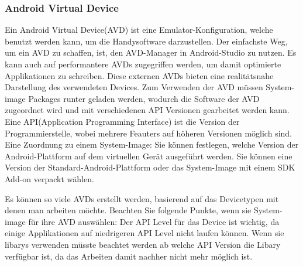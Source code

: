 \subsubsection{Android Virtual Device}
Ein Android Virtual Device(AVD) ist eine Emulator-Konfiguration, welche benutzt werden kann, um die Handysoftware darzustellen. 
Der einfachste Weg, um ein AVD zu schaffen, ist, den AVD-Manager in Android-Studio zu nutzen. 
Es kann auch auf performantere AVDs zugegriffen werden, um damit optimierte Applikationen zu schreiben.
Diese externen AVDs bieten eine realitätsnahe Darstellung des verwendeten Devices.
Zum Verwenden der AVD müssen System-image Packages runter geladen werden, wodurch die Software der AVD zugeordnet wird und mit verschiedenen API Versionen gearbeitet werden kann.
Eine API(Application Programming Interface) ist die Version der Programmierstelle, wobei mehrere Feauters auf höheren Versionen möglich sind. 
Eine Zuordnung zu einem System-Image: Sie können festlegen, welche Version der Android-Plattform auf dem virtuellen Gerät ausgeführt werden. Sie können eine Version der Standard-Android-Plattform oder das System-Image mit einem SDK Add-on verpackt wählen.

Es können so viele AVDs erstellt werden, basierend auf das Devicetypen mit denen man arbeiten möchte.
Beachten Sie folgende Punkte, wenn sie System-image für ihre AVD auswählen:
Der API Level für das Device ist wichtig, da einige Applikationen auf niedrigeren API Level nicht laufen können. Wenn sie libarys verwenden müsste beachtet werden ab welche API Version die Libary verfügbar ist, da das Arbeiten damit nachher nicht mehr möglich ist.


